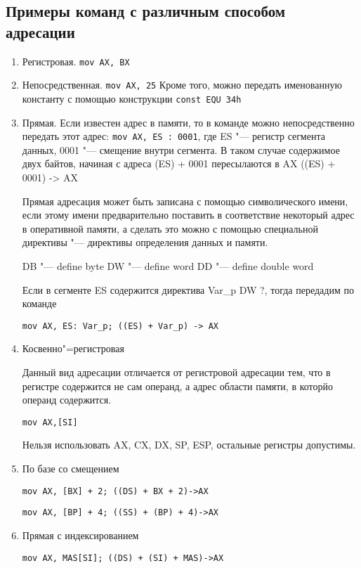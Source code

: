 \subsection{Примеры команд с различным способом адресации}

\begin{enumerate}
    \item Регистровая.
    \verb|mov AX, BX|
    \item Непосредственная.
    \verb|mov AX, 25|
    Кроме того, можно передать именованную константу с помощью конструкции \verb|const EQU 34h|
    \item Прямая. Если известен адрес в памяти, то в команде можно непосредственно передать этот адрес:
    \verb|mov AX, ES : 0001|, где ES "--- регистр сегмента данных, 0001 "--- смещение внутри сегмента. В таком случае
    содержимое двух байтов, начиная с адреса (ES) + 0001 пересылаются в AX
    ((ES) + 0001) -> AX

    Прямая адресация может быть записана с помощью символического имени, если этому имени
    предварительно поставить в соответствие некоторый адрес в оперативной памяти, а сделать
    это можно с помощью специальной директивы "--- директивы определения данных и памяти.
    
    DB "--- define byte
    DW "--- define word
    DD "--- define double word
    
    Если в сегменте ES содержится директива Var_p DW ?, тогда передадим по команде

    \verb|mov AX, ES: Var_p; ((ES) + Var_p) -> AX|
    \item Косвенно"=регистровая
    
    Данный вид адресации отличается от регистровой адресации тем, что в регистре содержится
    не сам операнд, а адрес области памяти, в которйо операнд содержится.
    
    \verb|mov AX,[SI]|
    
    Нельзя использовать AX, CX, DX, SP, ESP, остальные регистры допустимы.
    
    \item По базе со смещением

    \verb|mov AX, [BX] + 2; ((DS) + BX + 2)->AX|

    \verb|mov AX, [BP] + 4; ((SS) + (BP) + 4)->AX|
    
    \item Прямая с индексированием
    
    \verb|mov AX, MAS[SI]; ((DS) + (SI) + MAS)->AX|


\end{enumerate}
